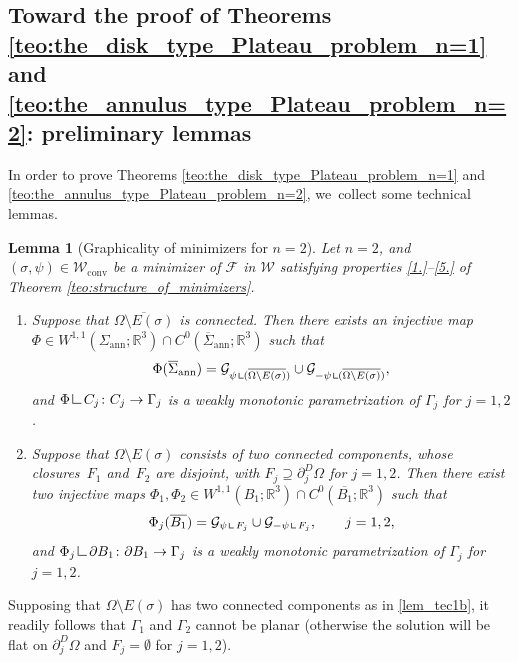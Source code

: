 \documentclass[JEP,XML,SOM,Unicode, NoFloatCountersInSection,published]{cedram}
\newcommand{\R}{\mathbb{R}}
\newcommand{\admclass}{\mathcal W}
\let\Om\Omega
\newcommand\admclassconv{{\mathcal W_\mathrm{conv}}}
\newcommand{\openannulus}{\Sigma_\mathrm{ann}}
\newcommand{\immclosedann}{\Phi({\overline\Sigma}_\mathrm{ann})}
\newcommand{\resa}{\mathop{\hbox{\vrule height 7pt width 0.5pt depth 0pt
\vrule height 0.5pt width 6pt depth 0pt}}\nolimits}
\newcommand{\resb}{\mathop{\hbox{\vrule height 4pt width 0.5pt depth 0pt
\vrule height 0.5pt width 3pt depth 0pt}}\nolimits}
\newcommand{\res}{\mathchoice{\resa}{\resa}{\resb}{\resb}}
\newtheorem{lemma}[theorem]{Lemma}
\theoremstyle{definition}
\begin{document}
\subsection{Toward the proof of Theorems \ref{teo:the_disk_type_Plateau_problem_n=1}
and \ref{teo:the_annulus_type_Plateau_problem_n=2}: preliminary lemmas}

In order to prove Theorems \ref{teo:the_disk_type_Plateau_problem_n=1} and
\ref{teo:the_annulus_type_Plateau_problem_n=2}, we~collect some technical lemmas.

\begin{lemma}[Graphicality of minimizers for $n=2$]\label{lem_tec1}
Let $n=2$, and $(\sigma,\psi)\in\admclassconv$ be a minimizer
of $\mathcal F$ in
$\admclass$
satisfying properties \ref{1.}--\ref{5.} of Theorem \ref{teo:structure_of_minimizers}.
\begin{enumerate}[{\rm(a)},wide]
\item\label{lem_tec1a}
Suppose that $\overline{\Om\setminus E(\sigma)}$ is connected.
Then there exists an injective map $\Phi\in W^{1,1}(\openannulus;\R^3)\cap C^0(\overline{\Sigma}_{\mathrm{ann}};\R^3)$ such that
\[
\immclosedann=\mathcal G_{\psi\res (\overline{\Om\setminus E(\sigma)})}\cup\mathcal G_{-\psi\res (\overline{\Om\setminus E(\sigma)})},
\]
and $\Phi\res C_j\colon C_j\to \Gamma_j$ is a weakly monotonic parametrization of $\Gamma_j$ for $j=1,2$.
\item\label{lem_tec1b}
Suppose that $\Om\setminus E(\sigma)$
consists of two connected components, whose closures~$F_1$ and~$F_2$ are disjoint,
with
$F_j \supseteq \partial^D_j\Om$ for $j=1,2$.
Then there exist two injective maps $\Phi_1,\Phi_2\in W^{1,1}(B_1;\R^3)\cap C^0(\overline{B_1};\R^3)$ such that
\[
\Phi_j(\overline{B_1})=\mathcal G_{\psi\res {F_j}}
\cup\mathcal G_{-\psi\res{F_j}},\qquad j=1,2,
\]
and $\Phi_j\res \partial B_1\colon\partial B_1\to \Gamma_j$ is a weakly monotonic parametrization of $\Gamma_j$ for $j=1,2$.
\end{enumerate}
\end{lemma}
Supposing that $\Om\setminus E(\sigma)$
has two connected components as in \ref{lem_tec1b}, it readily follows that $\Gamma_1$
and $\Gamma_2$
cannot be planar
(otherwise the solution will be flat on $\partial^D_j\Om$ and $F_j=\emptyset$
for $j=1,2$).
\end{document}
